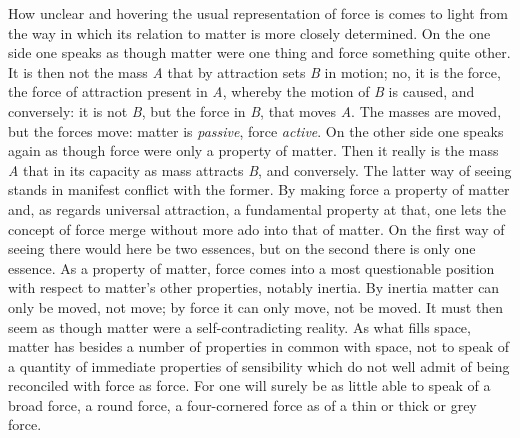 \documentclass[12pt,a4paper]{book}
\begin{document}
How unclear and hovering the usual representation of force is comes to light from the way
in which its relation to matter is more closely determined. On the one side one speaks as
though matter were one thing and force something quite other. It is then not the mass
\textit{A} that by attraction sets \textit{B} in motion; no, it is the force, the force
of attraction present in \textit{A}, whereby the motion of \textit{B} is caused, and
conversely: it is not \textit{B}, but the force in \textit{B}, that moves \textit{A}. The
masses are moved, but the forces move: matter is \emph{passive}, force \emph{active}. On
the other side one speaks again as though force were only a property of matter.
Then it really is the mass \textit{A} that in its capacity as mass attracts
\textit{B}, and conversely. The latter way of seeing stands in manifest conflict
with the former. By making force a property of matter and, as regards universal
attraction, a fundamental property at that, one lets the concept of force merge
without more ado into that of matter. On the first way of seeing there would here
be two essences, but on the second there is only one essence. As a property of
matter, force comes into a
most questionable position with respect to matter's other properties, notably
inertia. By inertia matter can only be moved, not move; by force it can only move,
not be moved. It must then seem as though matter were a self-contradicting reality.
As what fills space, matter has besides a number of properties in common with
space, not to speak of a quantity of immediate properties of sensibility which do
not well admit of being reconciled with force as force. For one will surely be as
little able to speak of a broad force, a round force, a four-cornered force as of a
thin or thick or grey force.
\end{document}
